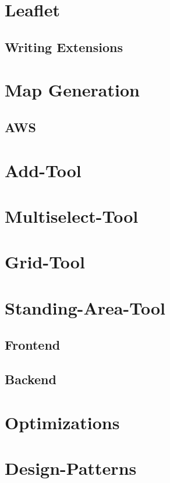 \section{Leaflet}

\subsection{Writing Extensions}

\section{Map Generation}

\subsection{AWS}

\section{Add-Tool}

\section{Multiselect-Tool}

\section{Grid-Tool}

\section{Standing-Area-Tool}

\subsection{Frontend}

\subsection{Backend}

\section{Optimizations}

\section{Design-Patterns}
